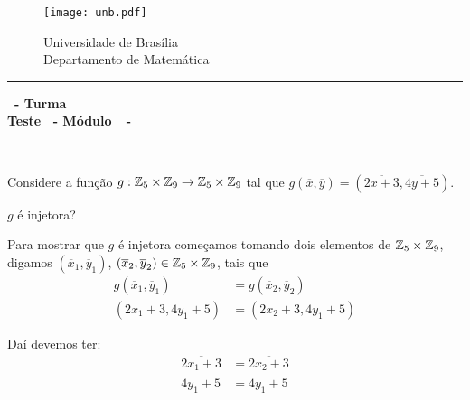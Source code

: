 \documentclass[12pt]{exam}
\begin{document}
    \begin{figure}[h]
        \begin{minipage}[c]{1.7cm}
            \texttt{[image: unb.pdf]}
        \end{minipage}
        \hspace{0pt}
        \begin{minipage}[c]{4in}
            {Universidade de Brasília} \\
            {Departamento de Matemática}
        \end{minipage}
    \end{figure}
    \hrule
    \begin{center}
        {\Large\bf \disciplina\ - Turma \turma}  \\
         {\large\bf Teste \numeroteste\ - Módulo\ \modulo\ -\ \dataavaliacao}
    \end{center}

    \\
    \vspace*{.01cm}

    \vspace{.4cm}

    \noindent Considere a função $g : \mathbb{Z}_5 \times \mathbb{Z}_9 \to \mathbb{Z}_5 \times \mathbb{Z}_9$ tal que $g(\overline{x},\overline{y}) = (\overline{2x + 3}, \overline{4y + 5})$.

    \vspace{.5cm}
    \questao $g$ é injetora?

    \solucao Para mostrar que $g$ é injetora começamos tomando dois elementos de $\mathbb{Z}_5 \times \mathbb{Z}_9$, digamos $(\overline{x}_1, \overline{y}_1)$, $(\overline{x}_2, \overline{y}_2) \in \mathbb{Z}_5 \times \mathbb{Z}_9$, tais que
    \begin{align*}
        g(\overline{x}_1, \overline{y}_1) &= g(\overline{x}_2, \overline{y}_2)\\
        (\overline{2x_1 + 3}, \overline{4y_1 + 5}) &= (\overline{2x_2 + 3}, \overline{4y_1 + 5})
    \end{align*}

    Daí devemos ter:
    \begin{align}
        \overline{2x_1 + 3} &= \overline{2x_2 + 3}\label{primeiraequacao}\\
        \overline{4y_1 + 5} &= \overline{4y_1 + 5}\label{segundaequacao}
    \end{align}
\end{document}
